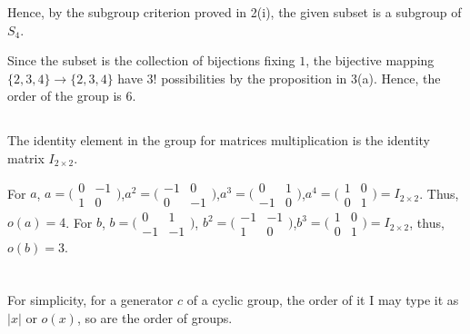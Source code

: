 \documentclass[12pt]{article}
\begin{document}
Hence, by the subgroup criterion proved in 2(i), the given subset is a subgroup of $S_4$.

Since the subset is the collection of bijections fixing $1$, the bijective mapping $\{2,3,4\}\rightarrow\{{2,3,4}\}$ have $3!$ possibilities by the proposition in 3(a). Hence, the order of the group is $6$.
\subsection{} %
The identity element in the group for matrices multiplication is the identity matrix $I_{2\times2}$.

For $a$, $a=\big(\begin{smallmatrix}0 & -1\\1 & 0\end{smallmatrix}\big)$,$a^2=\big(\begin{smallmatrix}-1 & 0\\0 & -1\end{smallmatrix}\big)$,$a^3=\big(\begin{smallmatrix}0 & 1\\-1 & 0\end{smallmatrix}\big)$,$a^4=\big(\begin{smallmatrix}1 & 0\\0 & 1\end{smallmatrix}\big)=I_{2\times2}$. Thus, $o(a)=4$. For $b$, $b=\big(\begin{smallmatrix}0 & 1\\-1 & -1\end{smallmatrix}\big)$, $b^2=\big(\begin{smallmatrix}-1 & -1\\1 & 0\end{smallmatrix}\big)$,$b^3=\big(\begin{smallmatrix}1 & 0\\0 & 1\end{smallmatrix}\big)=I_{2\times2}$, thus, $o(b)=3$.










\newpage
\section{} %
For simplicity, for a generator $c$ of a cyclic group, the order of it I may type it as $|x|$ or $o(x)$, so are the order of groups.
\end{document}
